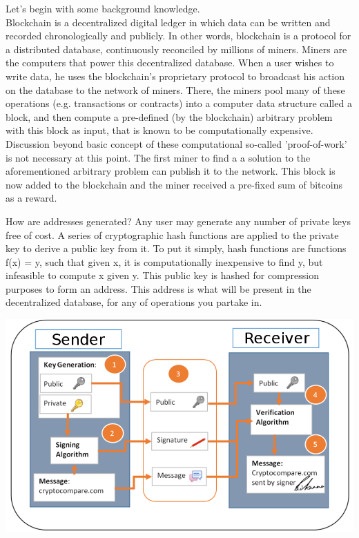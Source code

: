 Let's begin with some background knowledge.\\
Blockchain is a decentralized digital ledger in which data can be written and recorded chronologically and publicly.
In other words, blockchain is a protocol for a distributed database, continuously reconciled by millions of miners.
Miners are the computers that power this decentralized database.
When a user wishes to write data, he uses the blockchain's proprietary protocol to broadcast his action on the database
to the network of miners.
There, the miners pool many of these operations (e.g. transactions or contracts) into a computer data structure called a block,
and then compute a pre-defined (by the blockchain) arbitrary problem with this block as input,
that is known to be computationally expensive.
Discussion beyond basic concept of these computational so-called 'proof-of-work' is not necessary at this point.
The first miner to find a a solution to the aforementioned arbitrary problem can publish it to the network.
This block is now added to the blockchain and the miner received a pre-fixed sum of bitcoins as a reward.

How are addresses generated? 
Any user may generate any number of private keys free of cost.
A series of cryptographic hash functions are applied to the private key to derive a public key from it.
To put it simply, hash functions are functions f(x) = y, such that given x, it is computationally inexpensive to find y,
but infeasible to compute x given y.
This public key is hashed for compression purposes to form an address.
This address is what will be present in the decentralized database, for any of operations you partake in.


\begin{center}
\includegraphics[scale = 0.35]{diagrams/transaction_diagram.png}
\end{center}

